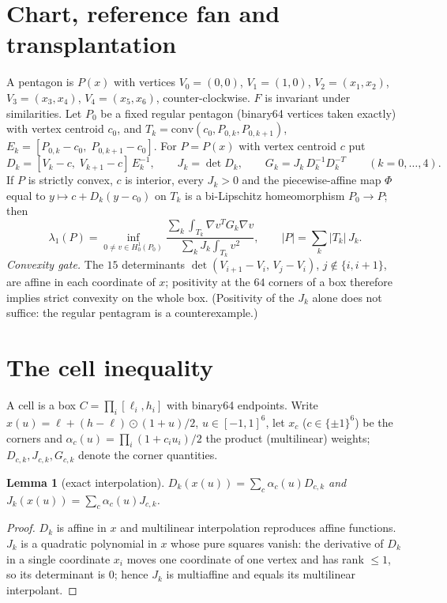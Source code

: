 \documentclass[11pt]{article}
\newtheorem{lemma}[theorem]{Lemma}
\theoremstyle{remark}
\begin{document}
\section{Chart, reference fan and transplantation}
A pentagon is $P(x)$ with vertices $V_0=(0,0)$, $V_1=(1,0)$, $V_2=(x_1,x_2)$, $V_3=(x_3,x_4)$, $V_4=(x_5,x_6)$,
counter-clockwise. $F$ is invariant under similarities. Let $P_0$ be a fixed regular pentagon (binary64 vertices taken
exactly) with vertex centroid $c_0$, and $T_k=\mathrm{conv}(c_0,P_{0,k},P_{0,k+1})$, $E_k=[P_{0,k}-c_0,\;P_{0,k+1}-c_0]$.
For $P=P(x)$ with vertex centroid $c$ put
\[
D_k=[V_k-c,\;V_{k+1}-c]\,E_k^{-1},\qquad J_k=\det D_k,\qquad G_k=J_k\,D_k^{-1}D_k^{-T}\qquad(k=0,\dots,4).
\]
If $P$ is strictly convex, $c$ is interior, every $J_k>0$ and the piecewise-affine map $\Phi$ equal to
$y\mapsto c+D_k(y-c_0)$ on $T_k$ is a bi-Lipschitz homeomorphism $P_0\to P$; then
\begin{equation}\label{eq:rq}
\lambda_1(P)=\inf_{0\ne v\in H^1_0(P_0)}\frac{\sum_k\int_{T_k}\nabla v^{T}G_k\nabla v}{\sum_k J_k\int_{T_k}v^2},
\qquad |P|=\sum_k |T_k|\,J_k .
\end{equation}
\emph{Convexity gate.} The $15$ determinants $\det(V_{i+1}-V_i,\,V_j-V_i)$, $j\notin\{i,i+1\}$, are affine in each
coordinate of $x$; positivity at the $64$ corners of a box therefore implies strict convexity on the whole box.
(Positivity of the $J_k$ alone does not suffice: the regular pentagram is a counterexample.)

\section{The cell inequality}
A cell is a box $C=\prod_i[\ell_i,h_i]$ with binary64 endpoints. Write $x(u)=\ell+(h-\ell)\odot(1+u)/2$,
$u\in[-1,1]^6$, let $x_c$ ($c\in\{\pm1\}^6$) be the corners and $\alpha_c(u)=\prod_i(1+c_iu_i)/2$ the product
(multilinear) weights; $D_{c,k},J_{c,k},G_{c,k}$ denote the corner quantities.

\begin{lemma}[exact interpolation]\label{lem:interp}
$D_k(x(u))=\sum_c\alpha_c(u)D_{c,k}$ and $J_k(x(u))=\sum_c\alpha_c(u)J_{c,k}$.
\end{lemma}
\begin{proof}
$D_k$ is affine in $x$ and multilinear interpolation reproduces affine functions. $J_k$ is a quadratic polynomial in
$x$ whose pure squares vanish: the derivative of $D_k$ in a single coordinate $x_i$ moves one coordinate of one vertex
and has rank $\le1$, so its determinant is $0$; hence $J_k$ is multiaffine and equals its multilinear interpolant.
\end{proof}
\end{document}
